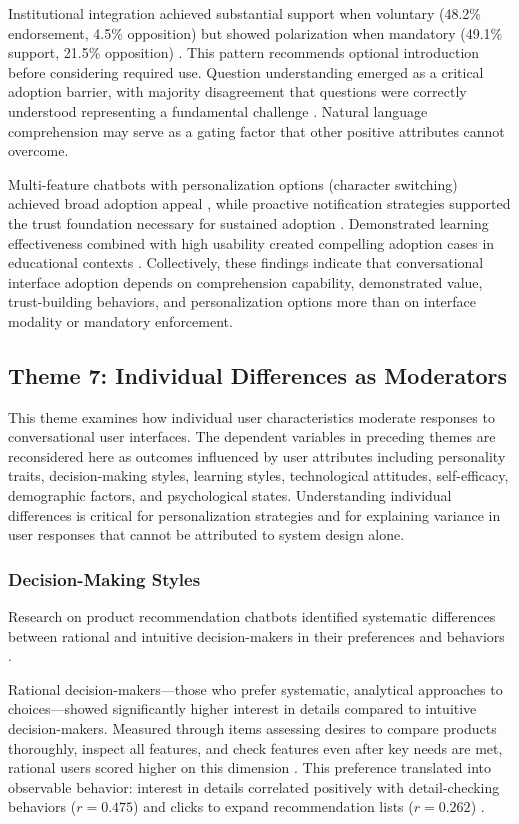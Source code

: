 \documentclass[manuscript,anonymous,sigconf]{acmart}
\begin{document}
Institutional integration achieved substantial support when voluntary (48.2\% endorsement, 4.5\% opposition) but showed polarization when mandatory (49.1\% support, 21.5\% opposition) \cite{A54}. This pattern recommends optional introduction before considering required use. Question understanding emerged as a critical adoption barrier, with majority disagreement that questions were correctly understood representing a fundamental challenge \cite{A54}. Natural language comprehension may serve as a gating factor that other positive attributes cannot overcome.

Multi-feature chatbots with personalization options (character switching) achieved broad adoption appeal \cite{A79}, while proactive notification strategies supported the trust foundation necessary for sustained adoption \cite{A16}. Demonstrated learning effectiveness combined with high usability created compelling adoption cases in educational contexts \cite{A34}. Collectively, these findings indicate that conversational interface adoption depends on comprehension capability, demonstrated value, trust-building behaviors, and personalization options more than on interface modality or mandatory enforcement.

\subsection{Theme 7: Individual Differences as Moderators}

This theme examines how individual user characteristics moderate responses to conversational user interfaces. The dependent variables in preceding themes are reconsidered here as outcomes influenced by user attributes including personality traits, decision-making styles, learning styles, technological attitudes, self-efficacy, demographic factors, and psychological states. Understanding individual differences is critical for personalization strategies and for explaining variance in user responses that cannot be attributed to system design alone.

\subsubsection{Decision-Making Styles}

Research on product recommendation chatbots identified systematic differences between rational and intuitive decision-makers in their preferences and behaviors \cite{A42}.

Rational decision-makers---those who prefer systematic, analytical approaches to choices---showed significantly higher interest in details compared to intuitive decision-makers. Measured through items assessing desires to compare products thoroughly, inspect all features, and check features even after key needs are met, rational users scored higher on this dimension \cite{A42}. This preference translated into observable behavior: interest in details correlated positively with detail-checking behaviors ($r = 0.475$) and clicks to expand recommendation lists ($r = 0.262$) \cite{A42}.
\end{document}

